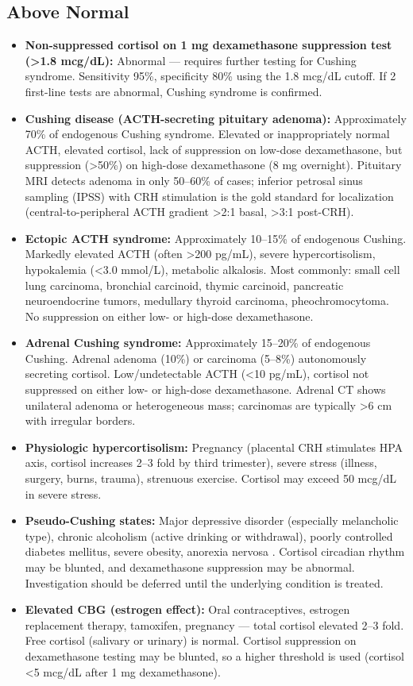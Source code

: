 \subsection*{Above Normal}
\begin{itemize}
  \item \textbf{Non-suppressed cortisol on 1 mg dexamethasone suppression test (>1.8 mcg/dL):} Abnormal --- requires further testing for Cushing syndrome. Sensitivity 95\%, specificity 80\% using the 1.8 mcg/dL cutoff. If 2 first-line tests are abnormal, Cushing syndrome is confirmed.
  \item \textbf{Cushing disease (ACTH-secreting pituitary adenoma):} Approximately 70\% of endogenous Cushing syndrome. Elevated or inappropriately normal ACTH, elevated cortisol, lack of suppression on low-dose dexamethasone, but suppression (>50\%) on high-dose dexamethasone (8 mg overnight). Pituitary MRI detects adenoma in only 50--60\% of cases; inferior petrosal sinus sampling (IPSS) with CRH stimulation is the gold standard for localization (central-to-peripheral ACTH gradient >2:1 basal, >3:1 post-CRH).
  \item \textbf{Ectopic ACTH syndrome:} Approximately 10--15\% of endogenous Cushing. Markedly elevated ACTH (often >200 pg/mL), severe hypercortisolism, hypokalemia (<3.0 mmol/L), metabolic alkalosis. Most commonly: small cell lung carcinoma, bronchial carcinoid, thymic carcinoid, pancreatic neuroendocrine tumors, medullary thyroid carcinoma, pheochromocytoma. No suppression on either low- or high-dose dexamethasone.
  \item \textbf{Adrenal Cushing syndrome:} Approximately 15--20\% of endogenous Cushing. Adrenal adenoma (10\%) or carcinoma (5--8\%) autonomously secreting cortisol. Low/undetectable ACTH (<10 pg/mL), cortisol not suppressed on either low- or high-dose dexamethasone. Adrenal CT shows unilateral adenoma or heterogeneous mass; carcinomas are typically >6 cm with irregular borders.
  \item \textbf{Physiologic hypercortisolism:} Pregnancy (placental CRH stimulates HPA axis, cortisol increases 2--3 fold by third trimester), severe stress (illness, surgery, burns, trauma), strenuous exercise. Cortisol may exceed 50 mcg/dL in severe stress.
  \item \textbf{Pseudo-Cushing states:} Major depressive disorder (especially melancholic type), chronic alcoholism (active drinking or withdrawal), poorly controlled diabetes mellitus, severe obesity, anorexia nervosa \cite{lacroix2015cushing}. Cortisol circadian rhythm may be blunted, and dexamethasone suppression may be abnormal. Investigation should be deferred until the underlying condition is treated.
  \item \textbf{Elevated CBG (estrogen effect):} Oral contraceptives, estrogen replacement therapy, tamoxifen, pregnancy --- total cortisol elevated 2--3 fold. Free cortisol (salivary or urinary) is normal. Cortisol suppression on dexamethasone testing may be blunted, so a higher threshold is used (cortisol <5 mcg/dL after 1 mg dexamethasone).
\end{itemize}

